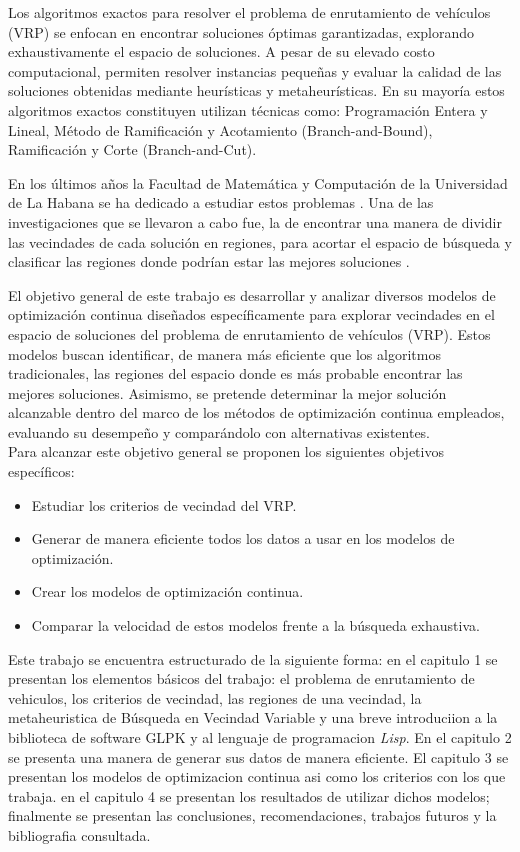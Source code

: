 \documentclass{article}
\begin{document}
Los algoritmos exactos para resolver el problema de enrutamiento de vehículos (VRP) se enfocan en encontrar soluciones óptimas garantizadas, explorando exhaustivamente el espacio de soluciones. A pesar de su elevado costo computacional, permiten resolver instancias pequeñas y evaluar la calidad de las soluciones obtenidas mediante heurísticas y metaheurísticas. En su mayoría estos algoritmos exactos constituyen utilizan técnicas como: Programación Entera y Lineal, Método de Ramificación y Acotamiento (Branch-and-Bound), Ramificación y Corte (Branch-and-Cut)\cite{ref7}.

En los últimos años la Facultad de Matemática y Computación de la Universidad de La Habana se ha dedicado a estudiar estos problemas \cite{ref5,ref6,ref4,ref3}. Una de las investigaciones que se llevaron a cabo fue, la de encontrar una manera de dividir las vecindades de cada solución en regiones, para acortar el espacio de búsqueda y clasificar las regiones donde podrían estar las mejores soluciones \cite{ref6}. 


El objetivo general de este trabajo es desarrollar y analizar diversos modelos de optimización continua diseñados específicamente para explorar vecindades en el espacio de soluciones del problema de enrutamiento de vehículos (VRP). Estos modelos buscan identificar, de manera más eficiente que los algoritmos tradicionales, las regiones del espacio donde es más probable encontrar las mejores soluciones. Asimismo, se pretende determinar la mejor solución alcanzable dentro del marco de los métodos de optimización continua empleados, evaluando su desempeño y comparándolo con alternativas existentes.\\

Para alcanzar este objetivo general se proponen los siguientes objetivos específicos:
\begin{itemize}
\item
Estudiar los criterios de vecindad del VRP.
\item
Generar de manera eficiente todos los datos a usar en los modelos de optimización.
\item
Crear los modelos de optimización continua.
\item
Comparar la velocidad de estos modelos frente a la búsqueda exhaustiva.
\end{itemize}

Este trabajo se encuentra estructurado de la siguiente forma: en el capitulo 1 se presentan los elementos básicos del trabajo: el problema de enrutamiento de vehiculos, los criterios de vecindad, las regiones de una vecindad, la metaheuristica de Búsqueda en Vecindad Variable y una breve introduciion a la biblioteca de software GLPK y al lenguaje de programacion \textit{Lisp}. En el capitulo 2 se presenta una manera de generar sus datos de manera eficiente. El capitulo 3 se presentan los modelos de optimizacion continua asi como los criterios con los que trabaja. en el capitulo 4 se presentan los resultados de utilizar dichos modelos; finalmente se presentan las conclusiones, recomendaciones, trabajos futuros y la bibliografia consultada.
\newpage

 
\end{document}

